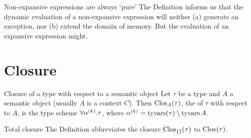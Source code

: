 \begin{clause}{Non-expansive expressions are always `pure'}
The Definition informs us that the dynamic evaluation of a non-expansive
expression will neither (a) generate an exception, nor (b) extend the
domain of memory. But the evaluation of an expansive expression might.
\end{clause}

  
\section{Closure}\label{sec:closure}

\begin{definition}{Closure of a type with respect to a semantic object}
Let $\tau$ be a type and $A$ a semantic object (usually $A$ is a context
$C$). Then ${\rm Clos}_{A}(\tau)$, the  of $\tau$ with respect
to $A$, is the type scheme $\forall\mbox{$\alpha^{(k)}$}.\tau$, where
$\mbox{$\alpha^{(k)}$}=\mathop{\rm tyvars}\nolimits(\tau)\setminus\mathop{\rm tyvars}\nolimits A$.
\end{definition}

\begin{definition}{Total closure}
The Definition abbreviates the  closure ${\rm Clos}_{\{\}}(\tau)$ to
${\rm Clos}_{}(\tau)$.
\end{definition}

